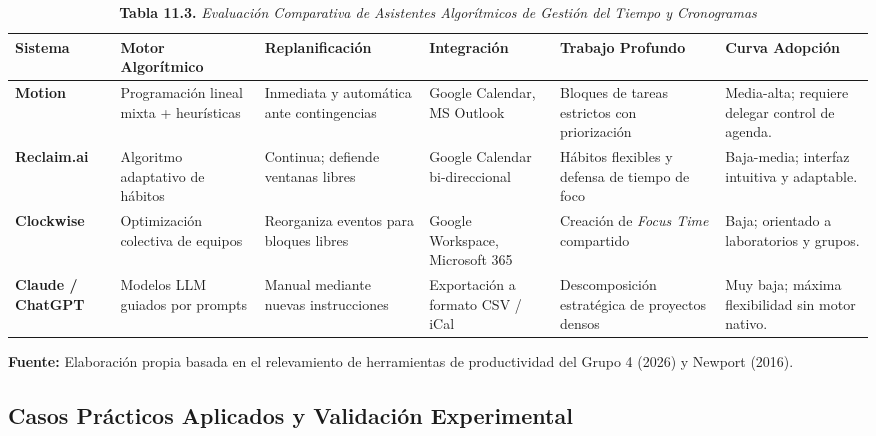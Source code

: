 \begin{table}[tbp]
\centering
\footnotesize
\begin{tcolorbox}[colback=white, colframe=unmsm_gold, arc=3pt, boxrule=0.8pt, top=0.2cm, bottom=0.2cm, left=0.3cm, right=0.3cm]
\caption*{\textbf{Tabla 11.3.} \textit{Evaluación Comparativa de Asistentes Algorítmicos de Gestión del Tiempo y Cronogramas}}
\vspace{-0.2cm}
\begin{tabularx}{\textwidth}{>{\raggedright\arraybackslash\bfseries}p{2.1cm} >{\raggedright\arraybackslash}p{2.3cm} >{\raggedright\arraybackslash}p{2.2cm} >{\raggedright\arraybackslash}p{2.2cm} >{\raggedright\arraybackslash}p{2.1cm} >{\raggedright\arraybackslash}X}
\toprule
Sistema & Motor Algorítmico & Replanificación & Integración & Trabajo Profundo & Curva Adopción \\
\midrule
Motion & Programación lineal mixta + heurísticas & Inmediata y automática ante contingencias & Google Calendar, MS Outlook & Bloques de tareas estrictos con priorización & Media-alta; requiere delegar control de agenda. \\
\addlinespace
Reclaim.ai & Algoritmo adaptativo de hábitos & Continua; defiende ventanas libres & Google Calendar bi-direccional & Hábitos flexibles y defensa de tiempo de foco & Baja-media; interfaz intuitiva y adaptable. \\
\addlinespace
Clockwise & Optimización colectiva de equipos & Reorganiza eventos para bloques libres & Google Workspace, Microsoft 365 & Creación de \textit{Focus Time} compartido & Baja; orientado a laboratorios y grupos. \\
\addlinespace
Claude / ChatGPT & Modelos LLM guiados por prompts & Manual mediante nuevas instrucciones & Exportación a formato CSV / iCal & Des\-com\-po\-si\-ción estratégica de proyectos densos & Muy baja; máxima flexibilidad sin motor nativo. \\
\bottomrule
\end{tabularx}
\vspace{0.35cm}
{\scriptsize \textbf{Fuente:} Elaboración propia basada en el relevamiento de herramientas de productividad del Grupo 4 (2026) y Newport (2016).}
\end{tcolorbox}
\end{table}

\subsection{Casos Prácticos Aplicados y Validación Experimental}

